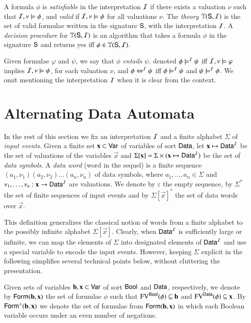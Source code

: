 \documentclass[10pt]{llncs}
\begin{document}
A formula $\phi$ is \emph{satisfiable} in the interpretation $\mathcal{I}$ if
there exists a valuation $\nu$ such that $\mathcal{I},\nu \models \phi$, and
\emph{valid} if $\mathcal{I},\nu \models \phi$ for all valuations $\nu$.  The
\emph{theory} $\mathbb{T}(\mathsf{S},\mathcal{I})$ is the set of valid formulae written
in the signature $\mathsf{S}$, with the interpretation $\mathcal{I}$. A \emph{decision
procedure} for $\mathbb{T}(\mathsf{S},\mathcal{I})$ is an algorithm that takes a formula
$\phi$ in the signature $\mathsf{S}$ and returns yes iff $\phi \in
\mathbb{T}(\mathsf{S},\mathcal{I})$. 

Given formulae $\varphi$ and $\psi$, we say that \emph{$\phi$ entails
  $\psi$}, denoted $\phi \models^{\mathcal{I}} \psi$ iff $\mathcal{I},\nu \models \varphi$
implies $\mathcal{I},\nu \models \psi$, for each valuation $\nu$, and $\phi
\Leftrightarrow^{\mathcal{I}} \psi$ iff $\phi \models^{\mathcal{I}} \psi$ and $\psi \models^{\mathcal{I}} \phi$.
We omit mentioning the interpretation $\mathcal{I}$ when it is clear from the
context.

\section{Alternating Data Automata}

In the rest of this section we fix an interpretation $\mathcal{I}$ and a finite
alphabet $\Sigma$ of \emph{input events}. Given a finite set $\mathbf x
\subset \mathsf{Var}$ of variables of sort $\mathsf{Data}$, let $\mathbf x \mapsto
\mathsf{Data}^{\mathcal{I}}$ be the set of valuations of the variables $\vec{x}$ and
$\Sigma[\mathbf x] = \Sigma \times (\mathbf x \mapsto \mathsf{Data}^{\mathcal{I}})$ be the
set of \emph{data symbols}. A \emph{data word} (word in the sequel) is
a finite sequence $(a_1,\nu_1)(a_2,\nu_2) \ldots (a_n,\nu_n)$ of data
symbols, where $a_1,\ldots,a_n \in \Sigma$ and $\nu_1,\ldots,\nu_n :
\mathbf x \rightarrow \mathsf{Data}^{\mathcal{I}}$ are valuations. We denote by
$\varepsilon$ the empty sequence, by $\Sigma^*$ the set of finite
sequences of input events and by $\Sigma[\vec{x}]^*$ the set of data
words over $\vec{x}$.

This definition generalizes the classical notion of words from a
finite alphabet to the possibly infinite alphabet
$\Sigma[\vec{x}]$. Clearly, when $\mathsf{Data}^{\mathcal{I}}$ is sufficiently large or
infinite, we can map the elements of $\Sigma$ into designated elements
of $\mathsf{Data}^{\mathcal{I}}$ and use a special variable to encode the input
events. However, keeping $\Sigma$ explicit in the following simplifies
several technical points below, without cluttering the presentation.

Given sets of variables $\mathbf b,\mathbf x \subset \mathsf{Var}$ of sort
$\mathsf{Bool}$ and $\mathsf{Data}$, respectively, we denote by
$\mathsf{Form}(\mathbf b,\mathbf x)$ the set of formulae $\phi$ such that
$\mathrm{FV}^{\mathsf{Bool}}(\phi) \subseteq \mathbf b$ and $\mathrm{FV}^{\mathsf{Data}}(\phi) \subseteq
\mathbf x$. By $\mathsf{Form}^+(\mathbf b,\mathbf x)$ we denote the set of formulae
from $\mathsf{Form}(\mathbf b,\mathbf x)$ in which each Boolean variable occurs
under an even number of negations.
\end{document}
